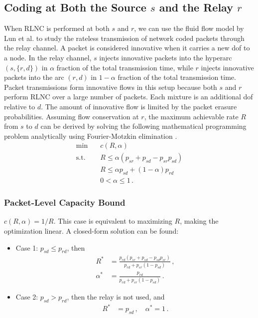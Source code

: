 \documentclass[journal, letterpaper]{IEEEtran}
\begin{document}
\subsection{Coding at Both the Source $s$ and the Relay $r$}\label{subsec:rs}

When RLNC is performed at both $s$ and $r$, we can use the fluid flow model by Lun et al. \cite{lun2008coding, traskov2008scheduling} to study the rateless transmission of network coded packets through the relay channel. A packet is considered innovative when it carries a new dof to a node. In the relay channel, $s$ injects innovative packets into the hyperarc $(s, \{r,d\})$ in $\alpha$ fraction of the total transmission time, while $r$ injects innovative packets into the arc $(r,d)$ in $1-\alpha$ fraction of the total transmission time. Packet transmissions form innovative flows in this setup because both $s$ and $r$ perform RLNC over a large number of packets. Each mixture is an additional dof relative to $d$. The amount of innovative flow is limited by the packet erasure probabilities. Assuming flow conservation at $r$, the maximum achievable rate $R$ from $s$ to $d$ can be derived by solving the following mathematical programming problem analytically using Fourier-Motzkin elimination \cite{traskovThesis}.
\begin{align*}
 \min \quad & c(R,\alpha) \\
 \mbox{s.t.} \quad
 & R \leq \alpha (p_{sr} + p_{sd} - p_{sr}p_{sd}) \\
 & R \leq \alpha p_{sd} + (1-\alpha)p_{rd}\\
 & 0 < \alpha \leq 1\,.
\end{align*}

\subsubsection{Packet-Level Capacity Bound}\label{subsucsec:traskov} $c(R,\alpha)=1/R$.
This case is equivalent to maximizing $R$, making the optimization linear. A closed-form solution can be found:
\begin{itemize}
 \item Case 1: $p_{sd} \leq p_{rd}$, then
  \begin{align*}
    R^*        & = \frac{p_{rd}(p_{sr} + p_{sd} - p_{sd}p_{sr})}{p_{rd}+p_{sr}(1-p_{sd})}\,, \\[4pt]
    \alpha ^*  & = \frac{p_{rd}}{p_{rd}+p_{sr}(1-p_{sd})}\,.
  \end{align*}
 \item Case 2: $p_{sd} > p_{rd}$, then the relay is not used, and
  \begin{align}
    R^* &       = p_{sd}\,, \quad \alpha^*=1\,. \label{eq:alpha}
  \end{align}
\end{itemize}
\end{document}
